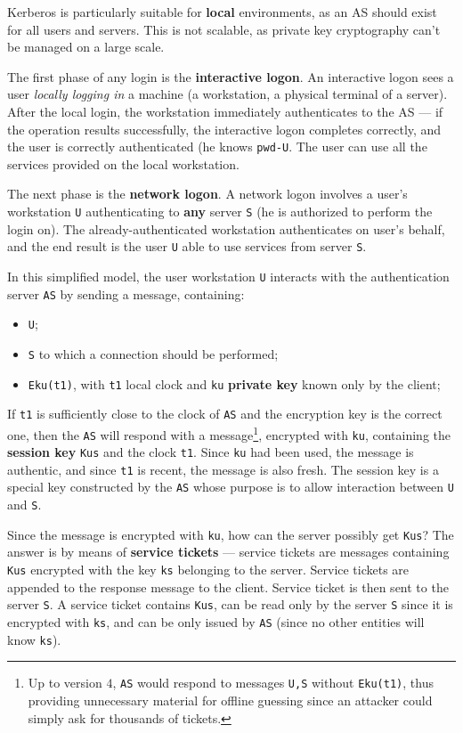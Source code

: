 \documentclass[10pt]{extreport}
\begin{document}
Kerberos is particularly suitable for \textbf{local} environments, as an AS
should exist for all users and servers. This is not scalable, as private key
cryptography can't be managed on a large scale.

The first phase of any login is the \textbf{interactive logon}. An interactive
logon sees a user \emph{locally logging in} a machine (a workstation, a
physical terminal of a server). After the local login, the workstation
immediately authenticates to the AS --- if the operation results successfully,
the interactive logon completes correctly, and the user is correctly
authenticated (he knows \texttt{pwd-U}. The user can use all the services
provided on the local workstation.

The next phase is the \textbf{network logon}. A network logon involves a user's
workstation \texttt{U} authenticating to \textbf{any} server \texttt{S} (he is
authorized to perform the login on). The already\--authenticated workstation
authenticates on user's behalf, and the end result is the user \texttt{U} able
to use services from server \texttt{S}.

In this simplified model, the user workstation \texttt{U} interacts with the authentication server \texttt{AS} by sending a message, containing:
\begin{itemize}
    \item \texttt{U};
    \item \texttt{S} to which a connection should be performed;
    \item \texttt{Eku(t1)}, with \texttt{t1} local clock and \texttt{ku}
        \textbf{private key} known only by the client;
\end{itemize}

If \texttt{t1} is sufficiently close to the clock of \texttt{AS} and the
encryption key is the correct one, then the \texttt{AS} will respond with a
message\footnote{Up to version $4$, \texttt{AS} would respond to messages
\texttt{U,S} without \texttt{Eku(t1)}, thus providing unnecessary material for
offline guessing since an attacker could simply ask for thousands of tickets.},
encrypted with \texttt{ku}, containing the \textbf{session key} \texttt{Kus}
and the clock \texttt{t1}. Since \texttt{ku} had been used, the message is
authentic, and since \texttt{t1} is recent, the message is also fresh. The
session key is a special key constructed by the \texttt{AS} whose purpose is to
allow interaction between \texttt{U} and \texttt{S}.

Since the message is encrypted with \texttt{ku}, how can the server possibly
get \texttt{Kus}? The answer is by means of \textbf{service tickets} --- service
tickets are messages containing \texttt{Kus} encrypted with the key \texttt{ks}
belonging to the server. Service tickets are appended to the response message
to the client. Service ticket is then sent to the server \texttt{S}. A service
ticket contains \texttt{Kus}, can be read only by the server \texttt{S} since
it is encrypted with \texttt{ks}, and can be only issued by \texttt{AS} (since
no other entities will know \texttt{ks}).
\end{document}
